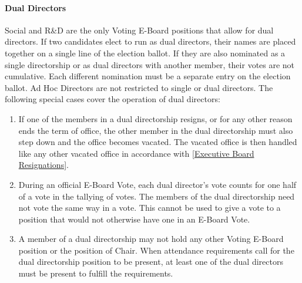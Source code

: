 \documentclass{article}
\newcommand{\asubsubsection}[1]{\paragraph{#1} \label{#1}}
\begin{document}
\asubsubsection{Dual Directors}
Social and R\&D are the only Voting E-Board positions that allow for dual directors.
If two candidates elect to run as dual directors, their names are placed together on a single line of the election ballot.
If they are also nominated as a single directorship or as dual directors with another member, their votes are not cumulative.
Each different nomination must be a separate entry on the election ballot.
Ad Hoc Directors are not restricted to single or dual directors.
The following special cases cover the operation of dual directors:
\begin{enumerate}
	\item If one of the members in a dual directorship resigns, or for any other reason ends the term of office, the other member in the dual directorship must also step down and the office becomes vacated.
	      The vacated office is then handled like any other vacated office in accordance with \ref{Executive Board Resignations}.
	\item During an official E-Board Vote, each dual director's vote counts for one half of a vote in the tallying of votes.
	      The members of the dual directorship need not vote the same way in a vote.
	      This cannot be used to give a vote to a position that would not otherwise have one in an E-Board Vote.
	\item A member of a dual directorship may not hold any other Voting E-Board position or the position of Chair.
	      When attendance requirements call for the dual directorship position to be present, at least one of the dual directors must be present to fulfill the requirements.
\end{enumerate}
\end{document}
